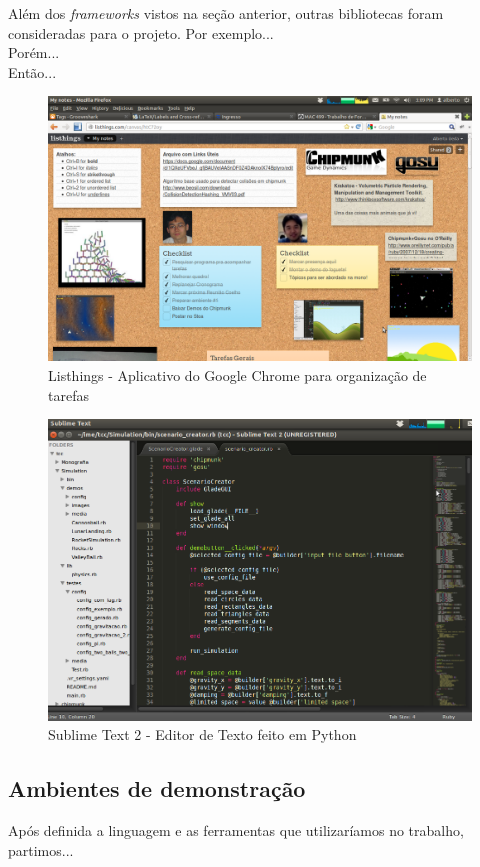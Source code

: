 Além dos \textit{frameworks} vistos na seção anterior, outras bibliotecas foram consideradas para o projeto. Por exemplo...\\
Porém...\\
Então...

\begin{figure}[H]
	\centering
	\includegraphics[scale=0.3]{images/listhings.png}
	\caption{Listhings - Aplicativo do Google Chrome para organização de tarefas }
\end{figure}

\begin{figure}[H]
	\centering
	\includegraphics[scale=0.3]{images/sublime-text-2.png}
	\caption{Sublime Text 2 - Editor de Texto feito em Python}
\end{figure}

\subsection{Ambientes de demonstração}
Após definida a linguagem e as ferramentas que utilizaríamos no trabalho, partimos...

